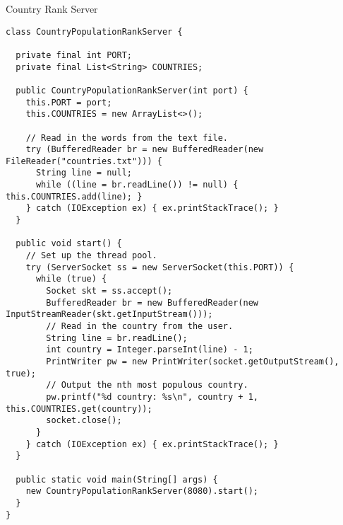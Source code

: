 \begin{cl}{Country Rank Server}
\begin{lstlisting}[language=MyJava]
class CountryPopulationRankServer {

  private final int PORT;
  private final List<String> COUNTRIES;

  public CountryPopulationRankServer(int port) {
    this.PORT = port;
    this.COUNTRIES = new ArrayList<>();

    // Read in the words from the text file.
    try (BufferedReader br = new BufferedReader(new FileReader("countries.txt"))) {
      String line = null;
      while ((line = br.readLine()) != null) { this.COUNTRIES.add(line); }
    } catch (IOException ex) { ex.printStackTrace(); }
  }

  public void start() {
    // Set up the thread pool.
    try (ServerSocket ss = new ServerSocket(this.PORT)) {
      while (true) {
        Socket skt = ss.accept();
        BufferedReader br = new BufferedReader(new InputStreamReader(skt.getInputStream()));
        // Read in the country from the user.
        String line = br.readLine();
        int country = Integer.parseInt(line) - 1;
        PrintWriter pw = new PrintWriter(socket.getOutputStream(), true);
        // Output the nth most populous country.
        pw.printf("%d country: %s\n", country + 1, this.COUNTRIES.get(country));
        socket.close();
      }
    } catch (IOException ex) { ex.printStackTrace(); }
  }

  public static void main(String[] args) {
    new CountryPopulationRankServer(8080).start();
  }
}
\end{lstlisting}
\end{cl}

